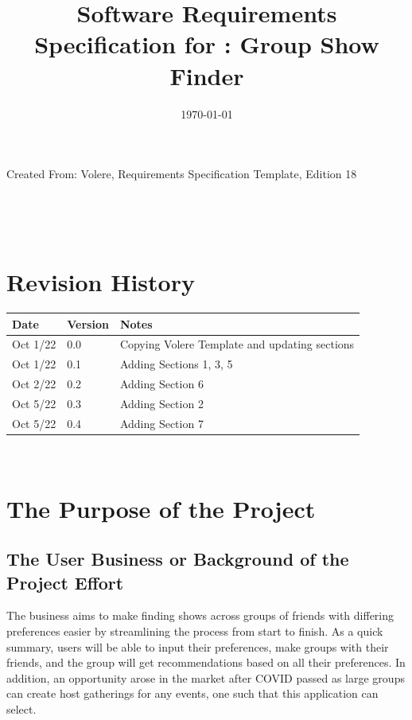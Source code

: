 \documentclass[12pt]{article}
\begin{document}
\title{Software Requirements Specification for \progname: Group Show Finder} 
\author{\authname}
\date{\today}
	
\maketitle
\vspace*{\fill}
Created From: Volere, Requirements Specification Template, Edition 18


~\newpage {}

\tableofcontents

~\newpage

\section*{Revision History}

\begin{tabularx}{\textwidth}{p{3cm}p{2cm}X}
\toprule {\bf Date} & {\bf Version} & {\bf Notes}\\
\midrule
Oct 1/22 & 0.0 & Copying Volere Template and updating sections\\
Oct 1/22 & 0.1 & Adding Sections 1, 3, 5\\
Oct 2/22 & 0.2 & Adding Section 6\\
Oct 5/22 & 0.3 & Adding Section 2\\
Oct 5/22 & 0.4 & Adding Section 7\\
\bottomrule
\end{tabularx}

~\newpage {}

\section{The Purpose of the Project}

\subsection{The User Business or Background of the Project Effort}
The business aims to make finding shows across groups of friends with differing preferences easier by streamlining the process from start to finish. As a quick summary, users will be able to input their preferences, make groups with their friends, and the group will get recommendations based on all their preferences. In addition, an opportunity arose in the market after COVID passed as large groups can create host gatherings for any events, one such that this application can select.
\end{document}
